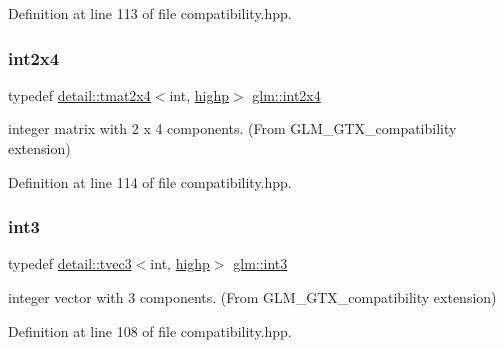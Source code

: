 Definition at line 113 of file compatibility.\+hpp.

\mbox{\label{group__gtx__compatibility_ga145a388c0d988490d6ce901a664faf50}} 
\subsubsection{\texorpdfstring{int2x4}{int2x4}}
{\footnotesize\ttfamily typedef \hyperlink{structglm_1_1detail_1_1tmat2x4}{detail\+::tmat2x4}$<$int, \hyperlink{namespaceglm_a0f04f086094c747d227af4425893f545ac6f7eab42eacbb10d59a58e95e362074}{highp}$>$ \hyperlink{group__gtx__compatibility_ga145a388c0d988490d6ce901a664faf50}{glm\+::int2x4}}



integer matrix with 2 x 4 components. (From G\+L\+M\+\_\+\+G\+T\+X\+\_\+compatibility extension) 



Definition at line 114 of file compatibility.\+hpp.

\mbox{\label{group__gtx__compatibility_gac305b0da08fad90d91854569679c935e}} 
\subsubsection{\texorpdfstring{int3}{int3}}
{\footnotesize\ttfamily typedef \hyperlink{structglm_1_1detail_1_1tvec3}{detail\+::tvec3}$<$int, \hyperlink{namespaceglm_a0f04f086094c747d227af4425893f545ac6f7eab42eacbb10d59a58e95e362074}{highp}$>$ \hyperlink{group__gtx__compatibility_gac305b0da08fad90d91854569679c935e}{glm\+::int3}}



integer vector with 3 components. (From G\+L\+M\+\_\+\+G\+T\+X\+\_\+compatibility extension) 



Definition at line 108 of file compatibility.\+hpp.

\mbox{\label{group__gtx__compatibility_ga2b1f3046fb4692c0c2f76b3933389868}} 
